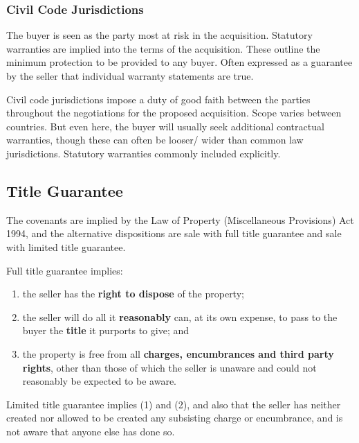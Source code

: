 \documentclass[
]{article}
\providecommand{\tightlist}{%
  \setlength{\itemsep}{0pt}\setlength{\parskip}{0pt}}
\begin{document}
\hypertarget{civil-code-jurisdictions}{%
\subsubsection{Civil Code
Jurisdictions}\label{civil-code-jurisdictions}}

The buyer is seen as the party most at risk in the acquisition.
Statutory warranties are implied into the terms of the acquisition.
These outline the minimum protection to be provided to any buyer. Often
expressed as a guarantee by the seller that individual warranty
statements are true.

Civil code jurisdictions impose a duty of good faith between the parties
throughout the negotiations for the proposed acquisition. Scope varies
between countries. But even here, the buyer will usually seek additional
contractual warranties, though these can often be looser/ wider than
common law jurisdictions. Statutory warranties commonly included
explicitly.

\hypertarget{title-guarantee}{%
\subsection{Title Guarantee}\label{title-guarantee}}

The covenants are implied by the Law of Property (Miscellaneous
Provisions) Act 1994, and the alternative dispositions are sale with
full title guarantee and sale with limited title guarantee.

Full title guarantee implies:

\begin{enumerate}
\def\labelenumi{\arabic{enumi}.}
\tightlist
\item
  the seller has the \textbf{right to dispose} of the property;
\item
  the seller will do all it \textbf{reasonably} can, at its own expense,
  to pass to the buyer the \textbf{title} it purports to give; and
\item
  the property is free from all \textbf{charges, encumbrances and third
  party rights}, other than those of which the seller is unaware and
  could not reasonably be expected to be aware.
\end{enumerate}

Limited title guarantee implies (1) and (2), and also that the seller
has neither created nor allowed to be created any subsisting charge or
encumbrance, and is not aware that anyone else has done so.
\end{document}
